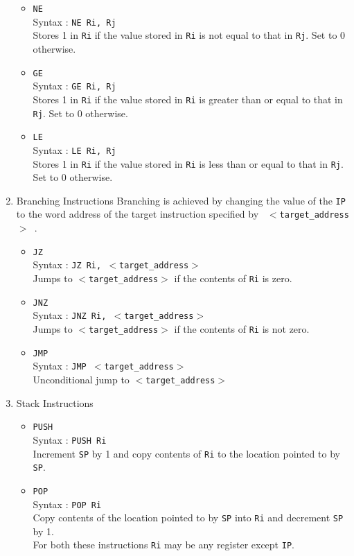 \documentclass[11pt]{report}
\begin{document}
\begin{enumerate}
\begin{itemize}
\item \texttt{NE}\\
Syntax : \texttt{NE Ri, Rj}\\
Stores 1 in \texttt{Ri} if the value stored in \texttt{Ri} is not equal to that in \texttt{Rj}. Set to 0 otherwise. 

\item \texttt{GE} \\
Syntax : \texttt{GE Ri, Rj} \\
Stores 1 in \texttt{Ri} if the value stored in \texttt{Ri} is greater than or equal to that in \texttt{Rj}. Set to 0 otherwise. 

\item \texttt{LE}\\
Syntax : \texttt{LE Ri, Rj}\\
Stores 1 in \texttt{Ri} if the value stored in \texttt{Ri} is less than or equal to that in \texttt{Rj}. Set to 0 otherwise. 
\end{itemize}


\item Branching Instructions
Branching is achieved by changing the value of the \texttt{IP} to the word address of the target instruction specified by \texttt{ $<$target\_address$>$ }. 
 
\begin{itemize}
\item \texttt{JZ}\\
Syntax : \texttt{JZ Ri, $<$target\_address$>$}\\
Jumps to \texttt{$<$target\_address$>$} if the contents of \texttt{Ri} is zero.
\item \texttt{JNZ}\\
Syntax : \texttt{JNZ Ri, $<$target\_address$>$}\\
Jumps to \texttt{$<$target\_address$>$} if the contents of \texttt{Ri} is not zero.
\item \texttt{JMP}\\
Syntax : \texttt{JMP $<$target\_address$>$}\\
Unconditional jump to \texttt{$<$target\_address$>$}\\

\end{itemize}

\item Stack Instructions
\begin{itemize}
\item \texttt{PUSH}\\
Syntax : \texttt{PUSH Ri}\\
Increment \texttt{SP} by 1 and copy contents of \texttt{Ri} to the location pointed to by \texttt{SP}.
\item \texttt{POP}\\
Syntax : \texttt{POP Ri}\\
Copy contents of the location pointed to by \texttt{SP} into \texttt{Ri} and decrement \texttt{SP} by 1.\\
For both these instructions \texttt{Ri} may be any register except \texttt{IP}.
\end{itemize}


\end{enumerate}
\end{document}
